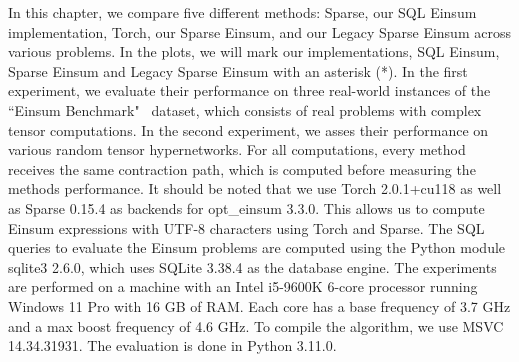 
In this chapter, we compare five different methods: Sparse, our SQL Einsum implementation, Torch, our 
Sparse Einsum, and our Legacy Sparse Einsum across various problems. In the plots, we will mark
our implementations, SQL Einsum, Sparse Einsum and Legacy Sparse Einsum with an asterisk (*). In the
first experiment, we evaluate their performance on three real-world instances of the
``Einsum Benchmark"~\cite{einsum_benchmark} dataset, which consists of real problems with complex
tensor computations. In the second experiment, we asses their performance on various random tensor
hypernetworks. For all computations, every method receives the same contraction path, which is computed
before measuring the methods performance. It should be noted that we use Torch 2.0.1+cu118 as well
as Sparse 0.15.4 as backends for opt\_einsum 3.3.0. This allows us to compute Einsum expressions with UTF-8 characters using Torch and Sparse. The SQL queries to evaluate the Einsum problems
are computed using the Python module sqlite3 2.6.0, which uses SQLite 3.38.4 as the database engine.
The experiments are performed on a machine with an Intel i5-9600K 6-core processor running Windows 11
Pro with 16 GB of RAM. Each core has a base frequency of 3.7 GHz and a max boost frequency of 4.6 GHz.
To compile the algorithm, we use MSVC 14.34.31931. The evaluation is done in Python 3.11.0.

